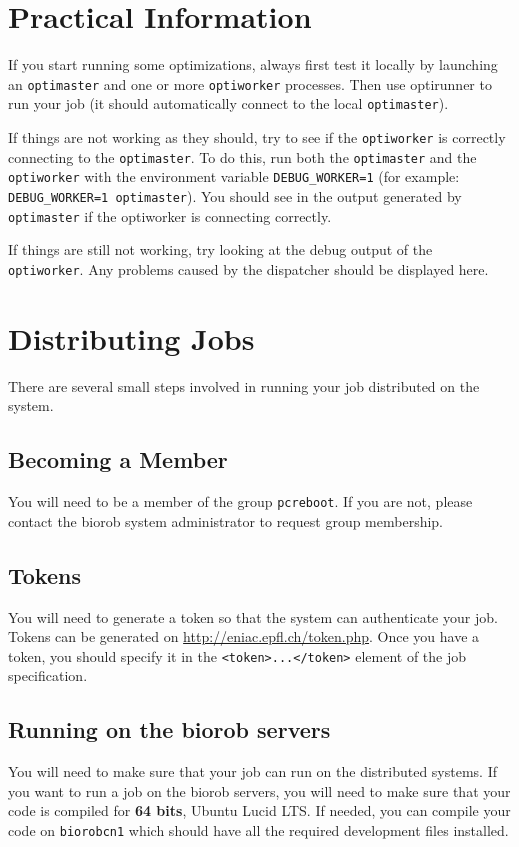 \documentclass{report}
\begin{document}
\section{Practical Information}
If you start running some optimizations, always first test it locally by
launching an \verb!optimaster! and one or more \verb!optiworker! processes.
Then use optirunner to run your job (it should automatically connect to the
local \verb!optimaster!).

If things are not working as they should, try to see if the \verb!optiworker!
is correctly connecting to the \verb!optimaster!. To do this, run both the
\verb!optimaster! and the \verb!optiworker! with the environment variable
\verb!DEBUG_WORKER=1! (for example: \verb!DEBUG_WORKER=1 optimaster!). You
should see in the output generated by \verb!optimaster! if the optiworker is
connecting correctly.

If things are still not working, try looking at the debug output of the
\verb!optiworker!. Any problems caused by the dispatcher should be displayed
here.

\section{Distributing Jobs}
There are several small steps involved in running your job distributed on the
system.

\subsection{Becoming a Member}
You will need to be a member of the group \verb!pcreboot!. If you
are not, please contact the biorob system administrator to request group
membership.

\subsection{Tokens}\label{sec:tokens}
You will need to generate a token so that the system can authenticate
your job. Tokens can be generated on \url{http://eniac.epfl.ch/token.php}. Once
you have a token, you should specify it in the \verb!<token>...</token>! element
of the job specification.

\subsection{Running on the biorob servers}
You will need to make sure that your job can run on the distributed
systems. If you want to run a job on the biorob servers, you will need to make
sure that your code is compiled for \textbf{64 bits}, Ubuntu Lucid LTS.
If needed, you can compile your code on \verb!biorobcn1! which should have all
the required development files installed.
\end{document}
